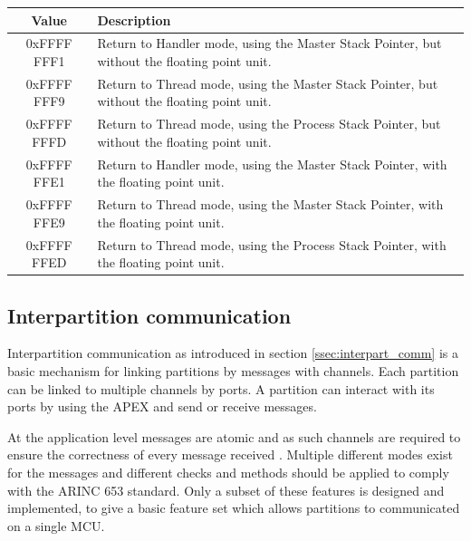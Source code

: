 \begin{table}[H]

	\centering
	\begin{tabular}{|c|p{10cm}|}
		\hline
		Value			&	Description 	\\
		\hline
		0xFFFF FFF1 	&	Return to Handler mode, using the Master Stack Pointer, but without the floating point unit.	\\
		\hline
		0xFFFF FFF9		&	Return to Thread mode, using the Master Stack Pointer, but without the floating point unit.		\\
		\hline
		0xFFFF FFFD		&	Return to Thread mode, using the Process Stack Pointer, but without the floating point unit.	\\
		\hline
		0xFFFF FFE1		&	Return to Handler mode, using the Master Stack Pointer, with the floating point unit.			\\
		\hline
		0xFFFF FFE9		&	Return to Thread mode, using the Master Stack Pointer, with the floating point unit.			\\
		\hline
		0xFFFF FFED		&	Return to Thread mode, using the Process Stack Pointer, with the floating point unit.			\\
		\hline
	\end{tabular}
	\label{tab:exc-return}
\end{table}

\subsection{Interpartition communication}
\label{design:interpart_comm}
Interpartition communication as introduced in section \ref{ssec:interpart_comm} is a basic mechanism for linking partitions by messages with channels.
Each partition can be linked to multiple channels by ports.
A partition can interact with its ports by using the APEX and send or receive messages.

At the application level messages are atomic and as such channels are required to ensure the correctness of every message received \cite{arinc_interpartition_comm_atomic}.
Multiple different modes exist for the messages and different checks and methods should be applied to comply with the ARINC 653 standard.
Only a subset of these features is designed and implemented,
to give a basic feature set which allows partitions to communicated on a single MCU.

